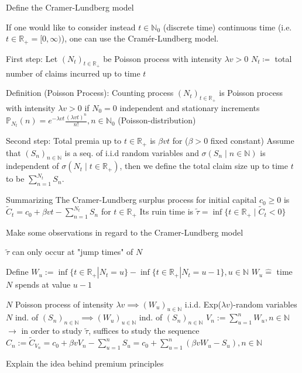 \documentclass[11pt,a4paper,twoside]{article}
\begin{document}
Define the Cramer-Lundberg model

If one would like to consider instead \(t \in \mathbb{N}_0\) (discrete time)
continuous time (i.e. \(t \in \mathbb{R}_+ = [0, \infty)\)),
one can use the Cramér-Lundberg model.

First step: 
Let \((N_t)_{t \in \mathbb{R}_+}\) be Poisson process with intensity \(\lambda v > 0\)
\(N_t \coloneqq \) total number of claims incurred up to time \(t\)

Definition (Poisson Process):
Counting process \((N_t)_{t \in \mathbb{R}_+}\) is Poisson process with intensity \(\lambda v > 0\) if
\(N_0 = 0\)
independent and stationary increments
\( \mathbb{P}_{N_t}(n) = e^{-\lambda vt} \frac{(\lambda v t)^n}{n!}, n \in \mathbb{N}_0\) 
(Poisson-distribution)

Second step:
Total premia up to \( t \in \mathbb{R}_{+}\) is \( \beta vt \) for (\( \beta > 0 \) fixed constant)
Assume that \( (S_n)_{n \in \mathbb{N}} \) is a seq. of i.i.d random variables
and \( \sigma(S_n \mid n \in \mathbb{N}) \) is independent of \( \sigma(N_t \mid t \in \mathbb{R}_{+}) \),
then we define the total claim size up to time \( t \) to be \( \sum_{n=1}^{N_t} S_n \).

Summarizing
The Cramer-Lundberg surplus process for initial capital \( c_0 \geq 0 \) is
\( \tilde{C}_t = c_0 + \beta vt - \sum_{n=1}^{N_t} S_n \) for \( t \in \mathbb{R}_{+} \)
Its ruin time is
\( \tilde{\tau} = \inf\{t \in \mathbb{R}_{+}\mid \tilde{C}_t < 0\}\)



Make some observations in regard to the Cramer-Lundberg model 

\(\tilde{\tau}\) can only occur at "jump times" of \(N\)

Define
\(W_u := \inf \{t \in \mathbb{R}_+ | N_t = u\} - \inf \{t \in \mathbb{R}_+ | N_t = u - 1\}, u \in \mathbb{N}\)
\(W_u \hat{=}\) time \(N\) spends at value \(u - 1\)

\(N\) Poisson process of intensity \(\lambda v \implies (W_u)_{u \in \mathbb{N}}\) i.i.d. Exp(\(\lambda v\))-random variables
\(N\) ind. of \((S_n)_{n \in \mathbb{N}} \implies (W_u)_{u \in \mathbb{N}}\) ind. of \((S_n)_{n \in \mathbb{N}}\)
\(V_n := \sum_{u = 1}^n W_u, n \in \mathbb{N}\)
\(\rightarrow\) in order to study \(\tilde{\tau}\), suffices to study the sequence
\(C_n := \tilde{C}_{V_n} = c_0 + \beta v V_n - \sum_{u = 1}^n S_u = c_0 + \sum_{u = 1}^n (\beta v W_u - S_u), n \in \mathbb{N}\)


Explain the idea behind premium principles
\end{document}
